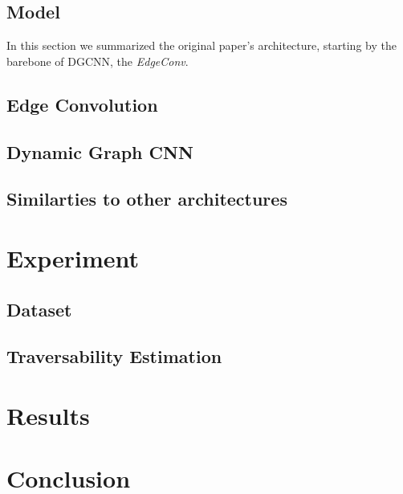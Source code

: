 \documentclass[twocolumn,showpacs,%
  nofootinbib,aps,superscriptaddress,%
  eqsecnum,prd,notitlepage,showkeys,10pt]{revtex4-1}
\begin{document}
\subsection{Model}
In this section we summarized the original paper's architecture, starting by the barebone of DGCNN, the \emph{EdgeConv}.
\subsection{Edge Convolution}
\subsection{Dynamic Graph CNN}
\subsection{Similarties to other architectures}
\section{Experiment}
\subsection{Dataset}
\subsection{Traversability Estimation}
\section{Results}

\section{Conclusion}
\newpage

\end{document}
